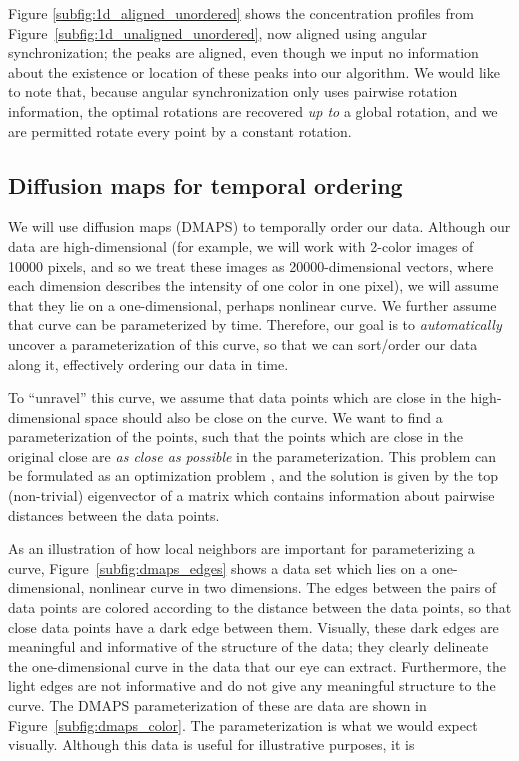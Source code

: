 \documentclass{pnastwo}
\begin{document}
\begin{article}
Figure \ref{subfig:1d_aligned_unordered} shows the concentration profiles from Figure~\ref{subfig:1d_unaligned_unordered}, now aligned using angular synchronization;
the peaks are aligned, even though we input no information about the existence or location of these peaks into our algorithm.
%
We would like to note that, because angular synchronization only uses pairwise rotation information, the optimal rotations are recovered {\em up to} a global rotation, and we are permitted rotate every point by a constant rotation.

\subsection{Diffusion maps for temporal ordering}

We will use diffusion maps (DMAPS) \cite{coifman2005geometric} to temporally order our data.
%
Although our data are high-dimensional (for example, we will work with 2-color images of 10000 pixels, and so we treat these images as 20000-dimensional vectors, where each dimension describes the intensity of one color in one pixel), we will assume that they lie on a one-dimensional, perhaps nonlinear curve.
%
We further assume that curve can be parameterized by time.
%
Therefore, our goal is to {\em automatically} uncover a parameterization of this curve, so that we can sort/order our data along it, effectively ordering our data in time.

To ``unravel'' this curve, we assume that data points which are close in the high-dimensional space should also be close on the curve.
%
We want to find a parameterization of the points, such that the points which are close in the original close are {\em as close as possible} in the parameterization.
%
This problem can be formulated as an optimization problem \cite{...}, and the solution is given by the top (non-trivial) eigenvector of a matrix which contains information about pairwise distances between the data points. 

As an illustration of how local neighbors are important for parameterizing a curve, Figure~\ref{subfig:dmaps_edges} shows a data set which lies on a one-dimensional, nonlinear curve in two dimensions.
%
The edges between the pairs of data points are colored according to the distance between the data points, so that close data points have a dark edge between them.
%
Visually, these dark edges are meaningful and informative of the structure of the data; they clearly delineate the one-dimensional curve in the data that our eye can extract.
%
Furthermore, the light edges are not informative and do not give any meaningful structure to the curve. 
%
The DMAPS parameterization of these are data are shown in Figure~\ref{subfig:dmaps_color}.
%
The parameterization is what we would expect visually.
%
Although this data is useful for illustrative purposes, it is 


\end{article}
\end{document}
